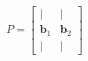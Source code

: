 \documentclass[preview]{standalone}
\begin{document}
\begin{align*}
P = \begin{bmatrix} | & | \\ \mathbf{b}_1 & \mathbf{b}_2 \\ | & | \end{bmatrix}
\end{align*}
\end{document}
